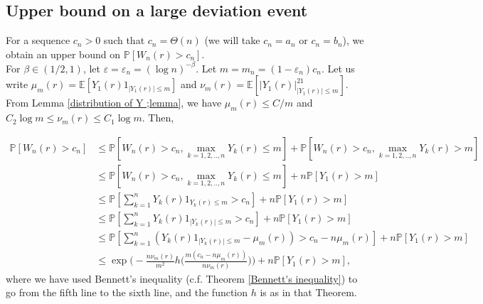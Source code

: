 \documentclass[9pt,a4paper,reqno]{amsart}
\theoremstyle{mine}
\theoremstyle{definition}
\theoremstyle{remark}
\renewcommand\epsilon{\varepsilon}
\newcommand{\mb}{\mathbb}
\begin{document}
\subsection{Upper bound on a large deviation event}

For a sequence $c_n >0$ such that $c_n = \Theta(n)$ (we will take $c_n = a_n$ or $c_n = b_n$), we obtain an upper bound on $\mb{P} [W_n(r) > c_n]$. \\ 

For $\beta \in (1/2, 1)$, let $\epsilon = \epsilon_n = (\log n)^{-\beta}$.
Let $m= m_n = (1-\epsilon_n)c_n$. Let us write $\mu_{m}(r) = \mb{E}[Y_1(r)1_{|Y_1(r)| \leq m }]$ and $ \nu_m(r) = \mb{E}[|Y_1(r)|^21_{|Y_1(r)| \leq m }]$. From Lemma \ref{distribution of Y ;lemma}, we have $\mu_m(r)\leq C/m$ and $C_2 \log m \leq \nu_m(r) \leq C_1 \log m $. Then, 

\begin{align}\label{truncate-and-bennett}
    \mb{P} [W_n(r) > c_n] &\leq \mb{P}[W_n(r) > c_n, \max_{k=1,2,..,n}Y_k(r) \leq m ] +  \mb{P}[W_n(r) > c_n, \max_{k=1,2,..,n}Y_k(r) >m] \nonumber \\
    &\leq \mb{P}[W_n(r) > c_n, \max_{k=1,2,..,n}Y_k(r) \leq m ] + n \mb{P}[Y_1(r) >m] \nonumber \\
    &\leq \mb{P}[ \sum_{k=1}^n Y_k(r)1_{Y_k(r) \leq m} > c_n] + n  \mb{P}[Y_1(r) > m] \nonumber\\
&\leq \mb{P}[ \sum_{k=1}^n Y_k(r)1_{|Y_k(r)| \leq m} > c_n] + n  \mb{P}[Y_1(r) > m] \\    
    &\leq  \mb{P}[ \sum_{k=1}^n (Y_k(r)1_{|Y_k(r)|\leq m} - \mu_m(r)) > c_n - n\mu_m(r)] + n  \mb{P}[Y_1(r) > m] \nonumber\\
& \leq \exp\biggl( - \frac{n \nu_m(r) }{m^2 } h\biggl(\frac{m(c_n- n \mu_m(r))}{n \nu_m(r) }\biggr)\biggr) + n  \mb{P}[Y_1(r) > m], \nonumber
\end{align}
where we have used Bennett's inequality (c.f. Theorem \ref{Bennett's inequality}) to go from the fifth line to the sixth line, and the function $h$ is as in that Theorem.

\vspace{2mm}
\end{document}
